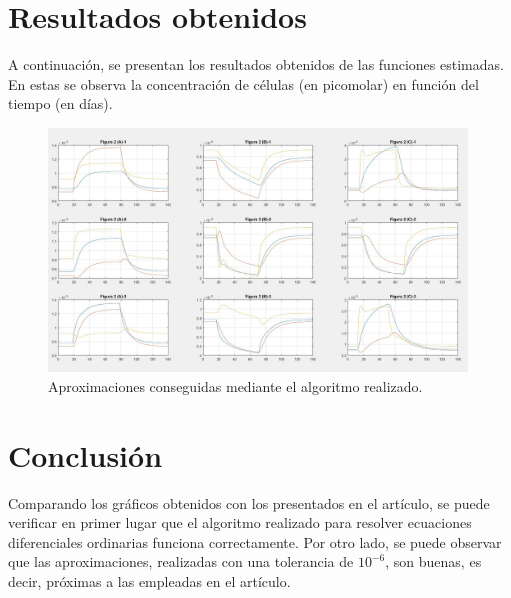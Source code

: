 \documentclass[a4paper]{article}
\begin{document}
\section{Resultados obtenidos}
A continuación, se presentan los resultados obtenidos de las funciones estimadas. En estas se observa la concentración de células (en picomolar) en función del tiempo (en días). 

\begin{figure}[H]
	\centering
	\includegraphics[width=0.99\textwidth]{GraficosLindos.JPG}
	\caption{Aproximaciones conseguidas mediante el algoritmo realizado.}
\end{figure}	


\section{Conclusión}
Comparando los gráficos obtenidos con los presentados en el artículo, se puede verificar en primer lugar que el algoritmo realizado para resolver ecuaciones diferenciales ordinarias funciona correctamente. Por otro lado, se puede observar que las aproximaciones, realizadas con una tolerancia de $10^{-6}$, son buenas, es decir, próximas a las empleadas en el artículo. 	
 
\end{document}
